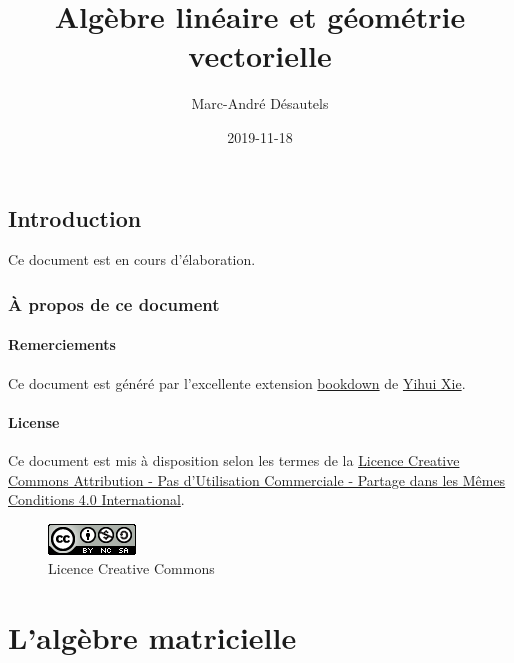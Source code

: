 \documentclass[]{book}
\title{Algèbre linéaire et géométrie vectorielle}
\author{Marc-André Désautels}
\date{2019-11-18}
\theoremstyle{definition}
\theoremstyle{definition}
\theoremstyle{definition}
\theoremstyle{remark}
\begin{document}
\maketitle

{
\setcounter{tocdepth}{2}
\tableofcontents
}
\hypertarget{introduction}{%
\chapter*{Introduction}\label{introduction}}

Ce document est en cours d'élaboration.

\hypertarget{uxe0-propos-de-ce-document}{%
\section*{À propos de ce document}\label{uxe0-propos-de-ce-document}}

\hypertarget{remerciements}{%
\subsection*{Remerciements}\label{remerciements}}

Ce document est généré par l'excellente extension \href{https://bookdown.org/}{bookdown} de \href{https://yihui.name/}{Yihui Xie}.

\hypertarget{license}{%
\subsection*{License}\label{license}}

Ce document est mis à disposition selon les termes de la \href{http://creativecommons.org/licenses/by-nc-sa/4.0/}{Licence Creative Commons Attribution - Pas d'Utilisation Commerciale - Partage dans les Mêmes Conditions 4.0 International}.

\begin{figure}
\centering
\includegraphics{resources/icons/license_cc.png}
\caption{Licence Creative Commons}
\end{figure}

\hypertarget{part-lalguxe8bre-matricielle}{%
\part{L'algèbre matricielle}\label{part-lalguxe8bre-matricielle}}
\end{document}

